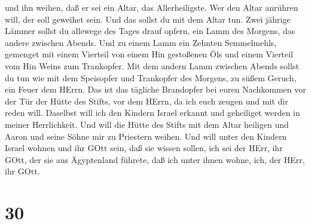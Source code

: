 und ihn weihen, daß er sei ein Altar, das Allerheiligste. Wer den Altar
anrühren will, der soll geweihet sein.  Und das sollst du
mit dem Altar tun. Zwei jährige Lämmer sollst du allewege des Tages
drauf opfern,  ein Lamm des Morgens, das andere zwischen
Abends.  Und zu einem Lamm ein Zehnten Semmelmehls,
gemenget mit einem Vierteil von einem Hin gestoßenen Öls und einem
Vierteil vom Hin Weins zum Trankopfer.  Mit dem andern Lamm
zwischen Abends sollst du tun wie mit dem Speisopfer und Trankopfer des
Morgens, zu süßem Geruch, ein Feuer dem HErrn.  Das ist das
tägliche Brandopfer bei euren Nachkommen vor der Tür der Hütte des
Stifts, vor dem HErrn, da ich euch zeugen und mit dir reden will.
 Daselbst will ich den Kindern Israel erkannt und
geheiliget werden in meiner Herrlichkeit.  Und will die
Hütte des Stifts mit dem Altar heiligen und Aaron und seine Söhne mir zu
Priestern weihen.  Und will unter den Kindern Israel wohnen
und ihr GOtt sein,  daß sie wissen sollen, ich sei der
HErr, ihr GOtt, der sie aus Ägyptenland führete, daß ich unter ihnen
wohne, ich, der HErr, ihr GOtt.

\hypertarget{section-29}{%
\section{30}\label{section-29}}

